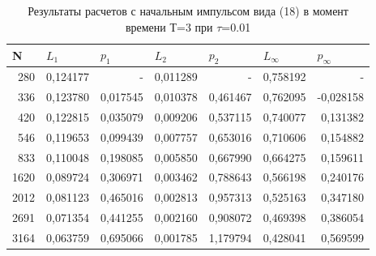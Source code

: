 \documentclass[14pt]{article}
\begin{document}
\begin{table}[H]
\caption{Результаты расчетов с начальным импульсом вида (18) в момент времени Т=3 при $\tau$=0.01}
\begin{tabular}{|r|r|r|r|r|r|r|}
\hline
\multicolumn{1}{|l|}{N} & \multicolumn{1}{l|}{$L_1$}        & \multicolumn{1}{l|}{$p_1$} & \multicolumn{1}{l|}{$L_2$}     & \multicolumn{1}{l|}{$p_2$} & \multicolumn{1}{l|}{$L_\infty$} & \multicolumn{1}{l|}{$p_\infty$} \\ \hline
280                     & 0,124177                         & -                         & 0,011289                      & -    & 0,758192                    & -                           \\ \hline
336                     & 0,123780                         & 0,017545                  & 0,010378                      & 0,461467                  & 0,762095                    & -0,028158                   \\ \hline
420                     & 0,122815                         & 0,035079                  & 0,009206                      & 0,537115                  & 0,740077                    & 0,131382                    \\ \hline
546                     & 0,119653                         & 0,099439                  & 0,007757                      & 0,653016                  & 0,710606                    & 0,154882                    \\ \hline
833                     & 0,110048                         & 0,198085                  & 0,005850                      & 0,667990                  & 0,664275                    & 0,159611                    \\ \hline
1620                    & 0,089724                         & 0,306971                  & 0,003462                      & 0,788643                  & 0,566198                    & 0,240176                    \\ \hline
2012                    & 0,081123                         & 0,465016                  & 0,002813                      & 0,957313                  & 0,525163                    & 0,347180                    \\ \hline
2691                    & 0,071354                         & 0,441255                  & 0,002160                      & 0,908072                  & 0,469398                    & 0,386054                    \\ \hline
3164                    & 0,063759                         & 0,695066                  & 0,001785                      & 1,179794                  & 0,428041                    & 0,569599                    \\ \hline

\end{tabular}
\end{table}
\end{document}
